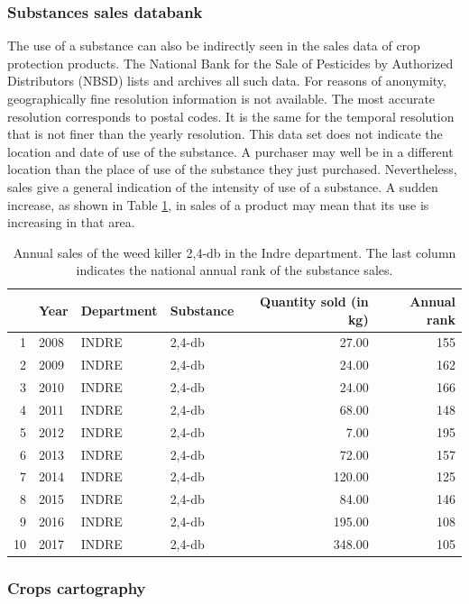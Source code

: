 \subsubsection{Substances sales databank}

The use of a substance can also be indirectly seen in the sales data of crop protection products. The National Bank for the Sale of Pesticides by Authorized Distributors (NBSD) \cite{BNVD} lists and archives all such data. For reasons of anonymity, geographically fine resolution information is not available. The most accurate resolution corresponds to postal codes. It is the same for the temporal resolution that is not finer than the yearly resolution. This data set does not indicate the location and date of use of the substance. A purchaser may well be in a different location than the place of use of the substance they just purchased. Nevertheless, sales give a general indication of the intensity of use of a substance. A sudden increase, as shown in Table \ref{tab:bnvd}, in sales of a product may mean that its use is increasing in that area.  

\begin{table}[ht]
\centering
\begin{tabular}{rlllrr}
  \hline
 & Year & Department & Substance & Quantity sold (in kg) & Annual rank \\ 
  \hline
1 & 2008 & INDRE & 2,4-db & 27.00 & 155 \\ 
  2 & 2009 & INDRE & 2,4-db & 24.00 & 162 \\ 
  3 & 2010 & INDRE & 2,4-db & 24.00 & 166 \\ 
  4 & 2011 & INDRE & 2,4-db & 68.00 & 148 \\ 
  5 & 2012 & INDRE & 2,4-db & 7.00 & 195 \\ 
  6 & 2013 & INDRE & 2,4-db & 72.00 & 157 \\ 
  7 & 2014 & INDRE & 2,4-db & 120.00 & 125 \\ 
  8 & 2015 & INDRE & 2,4-db & 84.00 & 146 \\ 
  9 & 2016 & INDRE & 2,4-db & 195.00 & 108 \\ 
  10 & 2017 & INDRE & 2,4-db & 348.00 & 105 \\ 
   \hline
\end{tabular}
   \caption{Annual sales of the weed killer 2,4-db in the Indre department. The last column indicates the national annual rank of the substance sales.}\label{tab:bnvd}
\end{table}

\subsubsection{Crops cartography}

